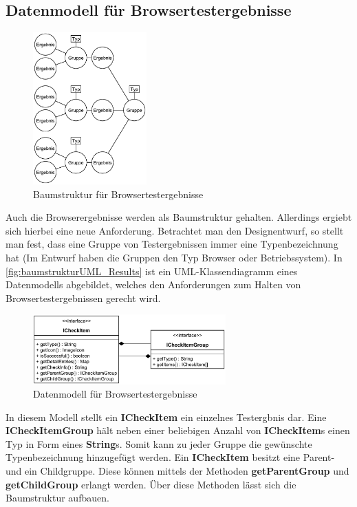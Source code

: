 \newpage

\subsection{Datenmodell für Browsertestergebnisse}

\begin{figure}
	\includegraphics[width=165px]{../graphic/diagrams/Baumstruktur_Results/Baumstruktur}
	\caption{Baumstruktur für Browsertestergebnisse}
	\label{fig:baumstruktur_Result}
\end{figure}

Auch die Browserergebnisse werden als Baumstruktur gehalten. Allerdings ergiebt sich hierbei eine neue Anforderung. Betrachtet man den Designentwurf, so stellt man fest, dass eine Gruppe von Testergebnissen immer eine Typenbezeichnung hat (Im Entwurf haben die Gruppen den Typ \glqq Browser\grqq\xspace oder \glqq Betriebssystem\grqq). In \autoref{fig:baumstrukturUML_Results} ist ein UML-Klassendiagramm eines Datenmodells abgebildet, welches den Anforderungen zum Halten von Browsertestergebnissen gerecht wird.

\begin{figure}[H]
	\flushright
	\includegraphics[width=280px]{../graphic/diagrams/CD_Baumstruktur_Results/Baumstruktur}
	\captionsetup{width=235px, justification=raggedleft}
	\caption{Datenmodell für Browsertestergebnisse}
	\label{fig:baumstrukturUML_Results}
\end{figure}

In diesem Modell stellt ein \textbf{ICheckItem} ein einzelnes Testergbnis dar. Eine \textbf{ICheckItemGroup} hält neben einer beliebigen Anzahl von \textbf{ICheckItem}s einen Typ in Form eines \textbf{String}s. Somit kann zu jeder Gruppe die gewünschte Typenbezeichnung hinzugefügt werden. Ein \textbf{ICheckItem} besitzt eine Parent- und ein Childgruppe. Diese können mittels der Methoden \textbf{getParentGroup} und \textbf{getChildGroup} erlangt werden. Über diese Methoden lässt sich die Baumstruktur aufbauen.

